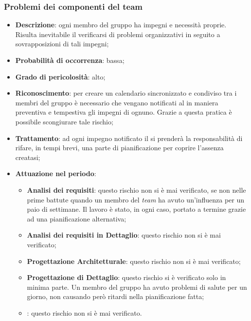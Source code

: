		\subsubsection{Problemi dei componenti del team}
		\begin{itemize}
			\item \textbf{Descrizione}: ogni membro del gruppo ha impegni e necessità proprie. Risulta inevitabile il verificarsi di problemi organizzativi in seguito a sovrapposizioni di tali impegni;
			\item \textbf{Probabilità di occorrenza}: bassa;
			\item \textbf{Grado di pericolosità}: alto;
			\item \textbf{Riconoscimento}: per creare un calendario sincronizzato e condiviso tra i membri del gruppo è necessario che vengano notificati al \textit{\Res} in maniera preventiva e tempestiva gli impegni di ognuno. Grazie a questa pratica è possibile scongiurare tale rischio;
			\item \textbf{Trattamento}: ad ogni impegno notificato il \textit{\Res} si prenderà la responsabilità di rifare, in tempi brevi, una parte di pianificazione per coprire l'assenza creatasi;
			\item \textbf{Attuazione nel periodo}:
			\begin{itemize}
				\item \textbf{Analisi dei requisiti}: questo rischio non si è mai verificato, se non nelle prime battute quando un membro del \textit{team} ha avuto un'influenza per un paio di settimane. Il lavoro è stato, in ogni caso, portato a termine grazie ad una pianificazione alternativa;
				\item \textbf{Analisi dei requisiti in Dettaglio}: questo rischio non si è mai verificato;
				\item \textbf{Progettazione Architetturale}: questo rischio non si è mai verificato;
				\item \textbf{Progettazione di Dettaglio}: questo rischio si è verificato solo in minima parte. Un membro del gruppo ha avuto problemi di salute per un giorno, non causando però ritardi nella pianificazione fatta;
				\item \textbf{\CO}: questo rischio non si è mai verificato. 
			\end{itemize}
		\end{itemize}
		
